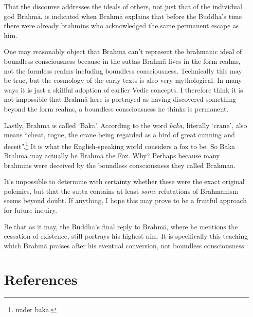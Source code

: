 \documentclass[10pt, openany]{book}
\begin{document}
That the discourse addresses the ideals of others, not just that of the individual god Brahmā, is indicated when Brahmā explains that before the Buddha’s time there were already brahmins who acknowledged the same permanent escape as him.


One may reasonably object that Brahmā can’t represent the brahmanic ideal of boundless consciousness because in the suttas Brahmā lives in the form realms, not the formless realms including boundless consciousness. Technically this may be true, but the cosmology of the early texts is also very mythological. In many ways it is just a skillful adoption of earlier Vedic concepts. I therefore think it is not impossible that Brahmā here is portrayed as having discovered something beyond the form realms, a boundless consciousness he thinks is permanent.


Lastly, Brahmā is called ‘Baka’. According to \cite{Monier-Williams} the word \textit{baka}, literally ‘crane’, also means “cheat, rogue, the crane being regarded as a bird of great cunning and deceit”.\footnote {\cite{Monier-Williams} under baka.} It is what the English-speaking world considers a fox to be. So Baka Brahmā may actually be Brahmā the Fox. Why? Perhaps because many brahmins were deceived by the boundless consciousness they called Brahman.


It’s impossible to determine with certainty whether these were the exact original polemics, but that the sutta contains at least \textit{some} refutations of Brahmanism seems beyond doubt. If anything, I hope this may prove to be a fruitful approach for future inquiry.


Be that as it may, the Buddha’s final reply to Brahmā, where he mentions the cessation of existence, still portrays his highest aim. It is specifically this teaching which Brahmā praises after his eventual conversion, not boundless consciousness.


\chapter{References}
\end{document}
